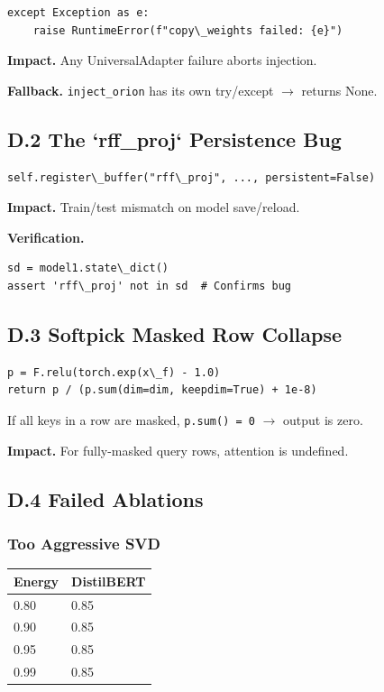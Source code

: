 \begin{lstlisting}
except Exception as e:
    raise RuntimeError(f"copy\_weights failed: {e}")
\end{lstlisting}

\textbf{Impact.} Any UniversalAdapter failure aborts injection.

\textbf{Fallback.} \texttt{inject\_orion} has its own try/except $\to$ returns None.

\subsection{D.2 The `rff\_proj` Persistence Bug}

\begin{lstlisting}
self.register\_buffer("rff\_proj", ..., persistent=False)
\end{lstlisting}

\textbf{Impact.} Train/test mismatch on model save/reload.

\textbf{Verification.}

\begin{lstlisting}
sd = model1.state\_dict()
assert 'rff\_proj' not in sd  # Confirms bug
\end{lstlisting}

\subsection{D.3 Softpick Masked Row Collapse}

\begin{lstlisting}
p = F.relu(torch.exp(x\_f) - 1.0)
return p / (p.sum(dim=dim, keepdim=True) + 1e-8)
\end{lstlisting}

If all keys in a row are masked, \texttt{p.sum() = 0} $\to$ output is zero.

\textbf{Impact.} For fully-masked query rows, attention is undefined.

\subsection{D.4 Failed Ablations}

\subsubsection{Too Aggressive SVD}

\begin{table}[H]
\centering
\small
\begin{tabular}{ll}
\toprule
\textbf{Energy} & \textbf{DistilBERT} \\
\midrule
0.80 & 0.85 \\
0.90 & 0.85 \\
0.95 & 0.85 \\
0.99 & 0.85 \\
\bottomrule
\end{tabular}
\end{table}

